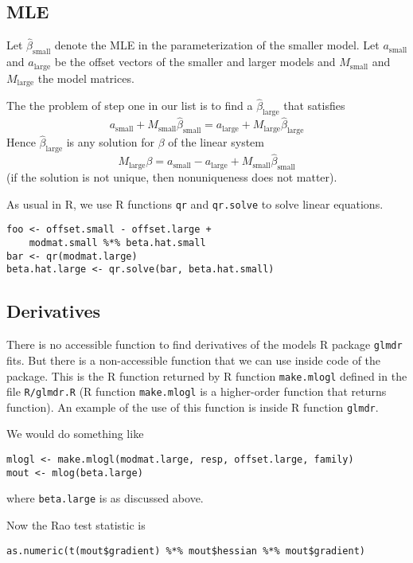 \documentclass{article}
\begin{document}
\subsection{MLE}

Let $\hat{\beta}_\text{small}$ denote the MLE in the parameterization
of the smaller model.  Let $a_\text{small}$ and $a_\text{large}$ be the
offset vectors of the smaller and larger models and
$M_\text{small}$ and $M_\text{large}$ the model matrices.

The the problem of step one in our list is to find a $\hat{\beta}_\text{large}$
that satisfies
$$
   a_\text{small} + M_\text{small} \hat{\beta}_\text{small}
   =
   a_\text{large} + M_\text{large} \hat{\beta}_\text{large}
$$
Hence $\hat{\beta}_\text{large}$ is any solution for $\beta$ of the
linear system
$$
   M_\text{large} \beta
   =
   a_\text{small} - a_\text{large} + M_\text{small} \hat{\beta}_\text{small}
$$
(if the solution is not unique, then nonuniqueness does not matter).

As usual in R, we use R functions \texttt{qr} and \texttt{qr.solve} to
solve linear equations.
\begin{verbatim}
foo <- offset.small - offset.large +
    modmat.small %*% beta.hat.small
bar <- qr(modmat.large)
beta.hat.large <- qr.solve(bar, beta.hat.small)
\end{verbatim}

\subsection{Derivatives}

There is no accessible function to find derivatives of the models R package
\texttt{glmdr} fits.  But there is a non-accessible function that we can
use inside code of the package.  This is the R function returned by
R function \texttt{make.mlogl} defined in the file \texttt{R/glmdr.R}
(R function \texttt{make.mlogl} is a higher-order function that returns
function).  An example of the use of this function is inside R function
\texttt{glmdr}.

We would do something like
\begin{verbatim}
mlogl <- make.mlogl(modmat.large, resp, offset.large, family)
mout <- mlog(beta.large)
\end{verbatim}
where \texttt{beta.large} is as discussed above.

Now the Rao test statistic is
\begin{verbatim}
as.numeric(t(mout$gradient) %*% mout$hessian %*% mout$gradient)
\end{verbatim}
\end{document}
